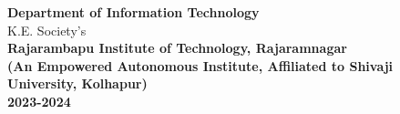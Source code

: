\begin{titlepage}
\begin{center}
  {\bf Department of Information Technology}\\
  K.E. Society’s\\
{\bf Rajarambapu Institute of Technology, Rajaramnagar}\\%
{\bf (An Empowered Autonomous Institute, Affiliated to Shivaji University, Kolhapur)}\\%
{\bf 2023-2024}

\end{center}

\end{titlepage}

\clearpage






